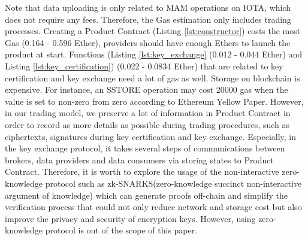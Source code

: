 \documentclass[conference]{IEEEtran}
\begin{document}
\begin{table}[h]
	\caption{Gas consumption for each function of Product Contract}
	\label{tab:gas}
	\centering
\end{table}

Note that data uploading is only related to MAM operations on IOTA, which does not require any fees. Therefore, the Gas estimation only includes trading processes. Creating a Product Contract (Listing \ref{lst:constructor}) costs the most Gas (0.164 - 0.596 Ether), providers should have enough Ethers to launch the product at start. Functions (Listing \ref{lst:key_exchange} (0.012 - 0.044 Ether) and Listing \ref{lst:key_certification}) (0.022 - 0.0834 Ether) that are related to key certification and key exchange need a lot of gas as well. Storage on blockchain is expensive. For instance, an SSTORE operation may cost 20000 gas when the value is set to non-zero from zero according to Ethereum Yellow Paper\cite{Ethereum}. However, in our trading model, we preserve a lot of information in Product Contract in order to record as more details as possible during trading procedures, such as ciphertexts,  signatures during key certification and key exchange. Especially, in the key exchange protocol, it takes several steps of communications between brokers, data providers and data consumers via storing states to Product Contract. Therefore, it is worth to explore the usage of the non-interactive zero-knowledge protocol such as zk-SNARKS(zero-knowledge succinct non-interactive argument of knowledge)\cite{Snark} which can generate proofs off-chain and simplify the verification process that could not only reduce network and storage cost but also improve the privacy and security of encryption keys. However, using zero-knowledge protocol is out of the scope of this paper.
\end{document}
